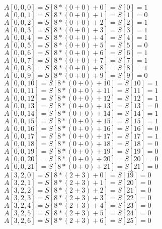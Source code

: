 \documentclass[12pt, a4paper]{article}
\begin{document}
\begin{enumerate}
\begin{enumerate}
$A[ 0 , 0 , 0 ]=S[8*( 0 + 0 )+ 0 ]=S[ 0 ]= 1 $\\
$A[ 0 , 0 , 1 ]=S[8*( 0 + 0 )+ 1 ]=S[ 1 ]= 0 $\\
$A[ 0 , 0 , 2 ]=S[8*( 0 + 0 )+ 2 ]=S[ 2 ]= 1 $\\
$A[ 0 , 0 , 3 ]=S[8*( 0 + 0 )+ 3 ]=S[ 3 ]= 1 $\\
$A[ 0 , 0 , 4 ]=S[8*( 0 + 0 )+ 4 ]=S[ 4 ]= 1 $\\
$A[ 0 , 0 , 5 ]=S[8*( 0 + 0 )+ 5 ]=S[ 5 ]= 0 $\\
$A[ 0 , 0 , 6 ]=S[8*( 0 + 0 )+ 6 ]=S[ 6 ]= 1 $\\
$A[ 0 , 0 , 7 ]=S[8*( 0 + 0 )+ 7 ]=S[ 7 ]= 1 $\\
$A[ 0 , 0 , 8 ]=S[8*( 0 + 0 )+ 8 ]=S[ 8 ]= 1 $\\
$A[ 0 , 0 , 9 ]=S[8*( 0 + 0 )+ 9 ]=S[ 9 ]= 0 $\\
$A[ 0 , 0 , 10 ]=S[8*( 0 + 0 )+ 10 ]=S[ 10 ]= 1 $\\
$A[ 0 , 0 , 11 ]=S[8*( 0 + 0 )+ 11 ]=S[ 11 ]= 1 $\\
$A[ 0 , 0 , 12 ]=S[8*( 0 + 0 )+ 12 ]=S[ 12 ]= 1 $\\
$A[ 0 , 0 , 13 ]=S[8*( 0 + 0 )+ 13 ]=S[ 13 ]= 0 $\\
$A[ 0 , 0 , 14 ]=S[8*( 0 + 0 )+ 14 ]=S[ 14 ]= 1 $\\
$A[ 0 , 0 , 15 ]=S[8*( 0 + 0 )+ 15 ]=S[ 15 ]= 1 $\\
$A[ 0 , 0 , 16 ]=S[8*( 0 + 0 )+ 16 ]=S[ 16 ]= 0 $\\
$A[ 0 , 0 , 17 ]=S[8*( 0 + 0 )+ 17 ]=S[ 17 ]= 1 $\\
$A[ 0 , 0 , 18 ]=S[8*( 0 + 0 )+ 18 ]=S[ 18 ]= 0 $\\
$A[ 0 , 0 , 19 ]=S[8*( 0 + 0 )+ 19 ]=S[ 19 ]= 0 $\\
$A[ 0 , 0 , 20 ]=S[8*( 0 + 0 )+ 20 ]=S[ 20 ]= 0 $\\
$A[ 0 , 0 , 21 ]=S[8*( 0 + 0 )+ 21 ]=S[ 21 ]= 0 $\\
$$\ldots$$
$A[ 3 , 2 , 0 ]=S[8*( 2 + 3 )+ 0 ]=S[ 19 ]= 0 $\\
$A[ 3 , 2 , 1 ]=S[8*( 2 + 3 )+ 1 ]=S[ 20 ]= 0 $\\
$A[ 3 , 2 , 2 ]=S[8*( 2 + 3 )+ 2 ]=S[ 21 ]= 0 $\\
$A[ 3 , 2 , 3 ]=S[8*( 2 + 3 )+ 3 ]=S[ 22 ]= 0 $\\
$A[ 3 , 2 , 4 ]=S[8*( 2 + 3 )+ 4 ]=S[ 23 ]= 0 $\\
$A[ 3 , 2 , 5 ]=S[8*( 2 + 3 )+ 5 ]=S[ 24 ]= 0 $\\
$A[ 3 , 2 , 6 ]=S[8*( 2 + 3 )+ 6 ]=S[ 25 ]= 0 $\\

\end{enumerate}
\end{enumerate}
\end{document}
